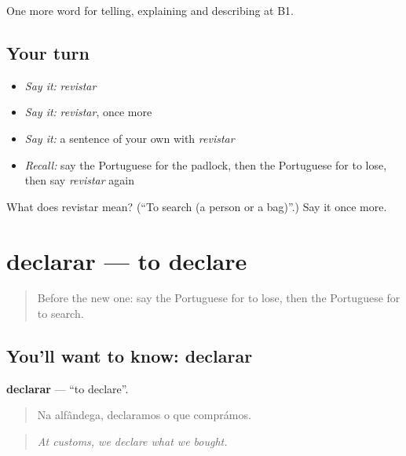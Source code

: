 \begin{grammarlens}[title={What you've built}]
One more word for telling, explaining and describing at B1.
\end{grammarlens}

\subsection*{Your turn}
\begin{itemize}
\raggedright
  \item \emph{Say it:} \emph{revistar}
  \item \emph{Say it:} \emph{revistar}, once more
  \item \emph{Say it:} a sentence of your own with \emph{revistar}
  \item \emph{Recall:} say the Portuguese for the padlock, then the Portuguese for to lose, then say \emph{revistar} again
\end{itemize}

\begin{tcolorbox}[breakable,colback=teal!4,colframe=teal!35!black,title={Before you move on}]
What does revistar mean? (\textquotedblleft{}To search (a person or a bag)\textquotedblright{}.) Say it once more.
\end{tcolorbox}
\section[declarar]{declarar — to declare}

\label{lesson:PT-C423-declarar}



\begin{quote}
Before the new one: say the Portuguese for to lose, then the Portuguese for to search.
\end{quote}

\subsection*{You'll want to know: declarar}
\textbf{declarar} — \textquotedblleft{}to declare\textquotedblright{}.

\begin{quote}
Na alfândega, declaramos o que comprámos.
\end{quote}

\begin{quote}
\emph{At customs, we declare what we bought.}
\end{quote}

